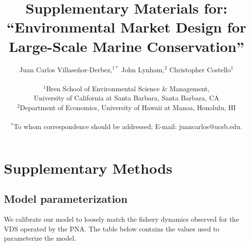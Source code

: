\documentclass[12pt]{article}
\title{Supplementary Materials for: ``Environmental Market Design for Large-Scale Marine Conservation''}
\author{Juan Carlos Villase\~{n}or-Derbez,$^{1\ast}$ John Lynham,$^{2}$ Christopher Costello$^{1}$\\
\\
\normalsize{$^{1}$Bren School of Environmental Science \& Management,}\\
\normalsize{University of California at Santa Barbara, Santa Barbara, CA}\\
\normalsize{$^{2}$Department of Economics, University of Hawaii at Manoa, Honolulu, HI}\\
\\
\normalsize{$^\ast$To whom correspondence should be addressed; E-mail: juancarlos@ucsb.edu.}
}
\date{}
\begin{document}

\baselineskip24pt


\maketitle



\renewcommand{\tablename}{Supplementary Table}
\renewcommand{\figurename}{Supplementary Figure}

\section{Supplementary Methods}

\subsection{Model parameterization}

We calibrate our model to loosely match the fishery dynamics observed for the VDS operated by the PNA. The table below contains the values used to parameterize the model.
\end{document}
